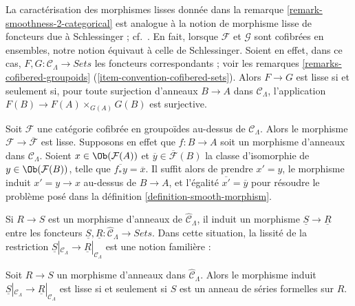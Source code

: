 \begin{remark}
\label{remark-compare-smooth-schlessinger}
La caractérisation des morphismes lisses donnée dans la remarque
\ref{remark-smoothness-2-categorical} est analogue à la notion de morphisme
lisse de foncteurs due à Schlessinger ; cf.\ \cite[Definition 2.2.]{Sch}. En
fait, lorsque $\mathcal{F}$ et $\mathcal{G}$ sont cofibrées en ensembles,
notre notion équivaut à celle de Schlessinger. Soient en effet, dans ce cas,
$F, G : \mathcal{C}_\Lambda \to \textit{Sets}$ les foncteurs correspondants ;
voir les remarques \ref{remarks-cofibered-groupoids}
(\ref{item-convention-cofibered-sets}).
Alors $F \to G$ est lisse si et seulement si, pour toute surjection d'anneaux
$B \to A$ dans $\mathcal{C}_\Lambda$, l'application
$F(B) \to F(A) \times_{G(A)} G(B)$ est surjective.
\end{remark}

\begin{remark}
\label{remark-smooth-to-iso-classes}
Soit $\mathcal{F}$ une catégorie cofibrée en groupoïdes au-dessus de
$\mathcal{C}_\Lambda$. Alors le morphisme
$\mathcal{F} \to \overline{\mathcal{F}}$ est lisse. Supposons en effet que
$f : B \to A$ soit un morphisme d'anneaux dans $\mathcal{C}_\Lambda$. Soient
$x \in \Ob(\mathcal{F}(A))$ et
$\overline{y} \in \overline{\mathcal{F}}(B)$
la classe d'isomorphie de $y \in \Ob(\mathcal{F}(B))$, telle que
$\overline{f_*y} = \overline{x}$. Il suffit alors de prendre $x' = y$, le
morphisme induit $x' = y \to x$ au-dessus de $B \to A$, et l'égalité
$\overline{x'} = \overline{y}$ pour résoudre le problème posé dans la
définition \ref{definition-smooth-morphism}.
\end{remark}

\noindent
Si $R \to S$ est un morphisme d'anneaux de
$\widehat{\mathcal{C}}_\Lambda$, il induit un morphisme
$\underline{S} \to \underline{R}$ entre les foncteurs
$\underline{S}, \underline{R}: \widehat{\mathcal{C}}_\Lambda
\to \textit{Sets}$. Dans cette situation, la lissité de la restriction
$\underline{S}|_{\mathcal{C}_\Lambda} \to
\underline{R}|_{\mathcal{C}_\Lambda}$ est une notion familière :

\begin{lemma}
\label{lemma-smooth-morphism-power-series}
Soit $R \to S$ un morphisme d'anneaux dans
$\widehat{\mathcal{C}}_\Lambda$. Alors le morphisme induit
$\underline{S}|_{\mathcal{C}_\Lambda} \to \underline{R}|_{\mathcal{C}_\Lambda}$
est lisse si et seulement si $S$ est un anneau de séries formelles sur $R$.
\end{lemma}

